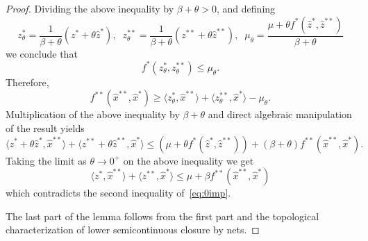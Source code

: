 \documentclass[11pt]{article}
\newcommand{\inner}[2]{\langle{#1},{#2}\rangle}
\begin{document}
\begin{proof}
Dividing the above inequality by $\beta+\theta>0$, and defining
\[
z^*_\theta=\frac {1}{\beta+\theta}
(z^*+\theta\hat z^*),\;\;
z^{**}_\theta=\frac {1}{\beta+\theta}
(z^{**}+\theta\hat z^{**}),\;\;
\mu_\theta=\frac{\mu+\theta f^*(\hat z^*,\hat z^{**})}{\beta+\theta}
\]
we conclude that 
%
\[ f^*(z^*_\theta,z^{**}_\theta)\leq \mu_\theta.
\]
Therefore,
\[ 
f^{**}(\hat x^{**},\hat x^*)\geq \inner{z^*_\theta}{\hat
  x^{**}}+\inner{z^{**}_\theta}{\hat x^*} -\mu_\theta.
\]
Multiplication  of the above inequality by $\beta+\theta$ and direct
algebraic manipulation of the result yields
\[\inner{z^*+\theta\hat z^*}{\hat x^{**}}
+\inner{z^{**}+\theta\hat z^{**}}{\hat x^*}
\leq (\mu+\theta f^*(\hat z^*,\hat z^{**}))+(\beta+\theta)f^{**}(\hat
x^{**},\hat x^*).
\]
%
Taking the limit as $\theta\to 0^+$ on the above inequality we get
\[
\inner{z^*}{\hat x^{**}}+\inner{z^{**}}{\hat x^*}\leq 
\mu+\beta f^{**}(\hat x^{**},\hat x^*)
\]
which contradicts the second inequality of~\eqref{eq:0imp}.

The last part of the lemma follows from the first part and the
topological characterization of lower semicontinuous
closure by nets.
\end{proof}
\end{document}
